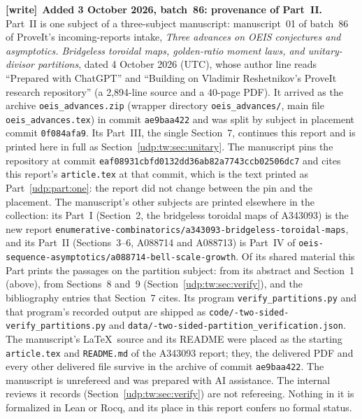 \documentclass[11pt]{article}
\theoremstyle{remark}\newtheorem{remark}[theorem]{Remark}
\newenvironment{writenote}[1][]{\par\smallskip\begingroup\small
 \noindent\textbf{[write]}\if\relax\detokenize{#1}\relax\else~\textbf{#1.}\fi\ }%
 {\par\endgroup\smallskip}
\numberwithin{equation}{section}
\begin{document}
\begin{writenote}[Added 3 October 2026, batch~86: provenance of Part~II]
Part~II is one subject of a three-subject manuscript: manuscript~01 of
batch~86 of ProveIt's incoming-reports intake, \emph{Three advances on OEIS
conjectures and asymptotics. Bridgeless toroidal maps, golden-ratio moment
laws, and unitary-divisor partitions}, dated 4 October 2026 (UTC), whose
author line reads ``Prepared with ChatGPT'' and ``Building on Vladimir
Reshetnikov's ProveIt research repository'' (a 2{,}894-line source and a
40-page PDF). It arrived as the archive
\texttt{oeis\_\allowbreak advances.zip} (wrapper directory
\texttt{oeis\_\allowbreak advances/}, main file
\texttt{oeis\_\allowbreak advances.tex}) in commit \texttt{ae9baa422} and
was split by subject in placement commit \texttt{0f084afa9}. Its Part~III,
the single Section~7, continues this report and is printed here in full as
Section~\ref{udp:tw:sec:unitary}. The manuscript pins the repository at
commit \texttt{eaf08931cbfd0132dd36ab82a7743ccb02506dc7} and cites this
report's \texttt{article.tex} at that commit, which is the text printed as
Part~\ref{udp:part:one}: the report did not change between the pin and the
placement. The manuscript's other subjects are printed elsewhere in the
collection: its Part~I (Section~2, the bridgeless toroidal maps of A343093)
is the new report
\texttt{enumerative-\allowbreak combinatorics/\allowbreak a343093-\allowbreak bridgeless-\allowbreak toroidal-\allowbreak maps},
and its Part~II (Sections~3--6, A088714 and A088713) is Part~IV of
\texttt{oeis-\allowbreak sequence-\allowbreak asymptotics/\allowbreak a088714-\allowbreak bell-\allowbreak scale-\allowbreak growth}.
Of its shared material this Part prints the passages on the partition
subject: from its abstract and Section~1 (above), from Sections~8 and~9
(Section~\ref{udp:tw:sec:verify}), and the bibliography entries that
Section~7 cites. Its program \texttt{verify\_\allowbreak partitions.py} and
that program's recorded output are shipped as
\texttt{code/-two-sided-\allowbreak verify\_\allowbreak partitions.py}
and
\texttt{data/-two-sided-\allowbreak partition\_\allowbreak verification.json}.
The manuscript's \LaTeX\ source and its README were placed as the starting
\texttt{article.tex} and \texttt{README.md} of the A343093 report; they, the
delivered PDF and every other delivered file survive in the archive of
commit \texttt{ae9baa422}. The manuscript is unrefereed and was prepared
with AI assistance. The internal reviews it records
(Section~\ref{udp:tw:sec:verify}) are not refereeing. Nothing in it is
formalized in Lean or Rocq, and its place in this report confers no formal
status.


\end{writenote}
\end{document}
